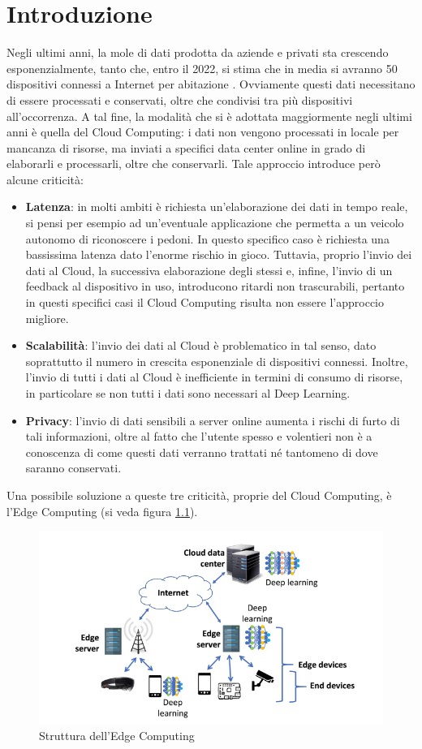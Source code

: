 \chapter{Introduzione}
Negli ultimi anni, la mole di dati prodotta da aziende e privati sta crescendo esponenzialmente, tanto che, entro il 2022, si stima che in media si avranno 50 dispositivi connessi a Internet per abitazione \cite{iotedge}. Ovviamente questi dati necessitano di essere processati e conservati, oltre che condivisi tra più dispositivi all'occorrenza. A tal fine, la modalità che si è adottata maggiormente negli ultimi anni è quella del Cloud Computing: i dati non vengono processati in locale per mancanza di risorse, ma inviati a specifici data center online in grado di elaborarli e processarli, oltre che conservarli. Tale approccio introduce però alcune criticità:
\begin{itemize}
	\item \textbf{Latenza}: in molti ambiti è richiesta un'elaborazione dei dati in tempo reale, si pensi per esempio ad un'eventuale applicazione che permetta a un veicolo autonomo di riconoscere i pedoni. In questo specifico caso è richiesta una bassissima latenza dato l'enorme rischio in gioco. Tuttavia, proprio l'invio dei dati al Cloud, la successiva elaborazione degli stessi e, infine, l'invio di un feedback al dispositivo in uso, introducono ritardi non trascurabili, pertanto in questi specifici casi il Cloud Computing risulta non essere l'approccio migliore.
	\item \textbf{Scalabilità}: l'invio dei dati al Cloud è problematico in tal senso, dato soprattutto il numero in crescita esponenziale di dispositivi connessi. Inoltre, l'invio di tutti i dati al Cloud è inefficiente in termini di consumo di risorse, in particolare se non tutti i dati sono necessari al Deep Learning.
	\item \textbf{Privacy}: l'invio di dati sensibili a server online aumenta i rischi di furto di tali informazioni, oltre al fatto che l'utente spesso e volentieri non è a conoscenza di come questi dati verranno trattati né tantomeno di dove saranno conservati.
\end{itemize}
Una possibile soluzione a queste tre criticità, proprie del Cloud Computing, è l'Edge Computing (si veda figura \ref{edge}). 
\begin{figure}[H]
	\centering
	\includegraphics[width=\linewidth]{pics/edgecomputing.jpeg}
	\caption{Struttura dell'Edge Computing}
	\label{edge}
\end{figure}
